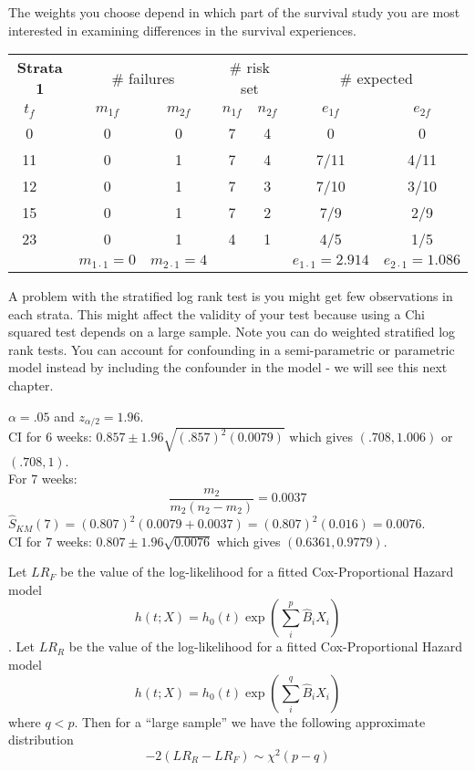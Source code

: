 \documentclass{article}
\begin{document}
The weights you choose depend in which part of the survival study you are most interested in examining differences in the survival experiences.

\begin{center}
\begin{tabular}{ c c c c c c c c}
\multicolumn{2}{c}{\textbf{Strata 1}} & \multicolumn{2}{c}{\# failures} & \multicolumn{2}{c}{\# risk set} & \multicolumn{2}{c}{\# expected} \\
 $t_{f}$ & & $m_{1f}$ & $m_{2f}$ & $n_{1f}$ & $n_{2f}$ & $e_{1f}$ & $e_{2f}$ \\ \hline
0 & & 0 & 0  & 7 & 4 & 0 & 0 \\
11 & & 0 & 1 & 7 & 4 & 7/11 & 4/11 \\
12 & & 0 & 1 & 7 & 3 & 7/10 & 3/10 \\
15 & & 0 & 1 & 7 & 2 & 7/9 & 2/9 \\
23 & & 0 & 1 & 4 & 1 & 4/5 & 1/5 \\ \hline
 &&  $m_{1 \cdot 1}=0$&$m_{2 \cdot 1}=4$ & & & $e_{1 \cdot 1} = 2.914$ & $e_{2 \cdot 1}=1.086$
\end{tabular}
\end{center}

A problem with the stratified log rank test is you might get few observations in each strata. This might affect the validity of your test because using a Chi squared test depends on a large sample. Note you can do weighted stratified log rank tests. You can account for confounding in a semi-parametric or parametric model instead by including the confounder in the model - we will see this next chapter.

$\alpha=.05$ and $z_{\alpha/2}=1.96$. \\

CI for 6 weeks: $0.857 \pm 1.96 \sqrt{(.857)^2(0.0079)}$ which gives $(.708,1.006)$ or $(.708,1)$. \\

For 7 weeks: 
\[ \frac{m_2}{m_2(n_2-m_2)} = 0.0037
\]
$\hat{S}_{KM}(7) = (0.807)^2(0.0079+0.0037)=(0.807)^2(0.016) = 0.0076 $. \\
CI for 7 weeks: $0.807 \pm 1.96 \sqrt{0.0076}$ which gives $(0.6361, 0.9779)$.  



 Let $LR_F$ be the value of the log-likelihood for a fitted Cox-Proportional Hazard model
\[ h(t;X) = h_0(t) \exp(\sum_i^p \hat{B}_iX_i) \].
Let $LR_R$ be the value of the log-likelihood for a fitted Cox-Proportional Hazard model
\[ h(t;X) = h_0(t) \exp(\sum_i^q \hat{B}_iX_i) \]
where $q<p$.
Then for a ``large sample'' we have the following approximate distribution
\[
-2(LR_R - LR_F) \sim \chi^2(p-q)
\]
\end{document}
